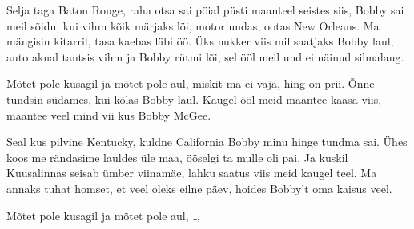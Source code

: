 Selja taga Baton Rouge, raha otsa sai
p\"oial p\"usti maanteel seistes siis,
Bobby sai meil s\~oidu, kui vihm k\~oik m\"arjaks l\"oi,
motor undas, ootas New Orleans.
Ma m\"angisin kitarril, tasa kaebas l\"abi \"o\"o.
\"Uks nukker viis mil saatjaks Bobby laul,
auto aknal tantsis vihm ja Bobby r\"utmi l\~oi,
sel \"o\"ol meil und ei n\"ainud silmalaug.

M\~otet pole kusagil ja m\~otet pole aul,
miskit ma ei vaja, hing on prii.
\~Onne tundsin s\"udames, 
kui k\~olas Bobby laul.
Kaugel \"o\"ol meid maantee kaasa viis,
maantee veel mind vii
kus Bobby McGee.

Seal kus pilvine Kentucky, kuldne California
Bobby minu hinge tundma sai.
\"Uhes koos me r\"andasime lauldes \"ule maa,
\"o\"oselgi ta mulle oli pai.
Ja kuskil Kuusalinnas seisab \"umber viinam\"ae,
lahku saatus viis meid kaugel teel.
Ma annaks tuhat homset, et veel oleks eilne p\"aev,
hoides Bobby't oma kaisus veel.

M\~otet pole kusagil ja m\~otet pole aul, \ldots